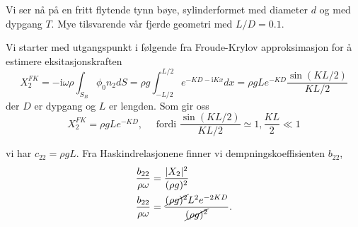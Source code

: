 

Vi ser nå på en fritt flytende tynn bøye, sylinderformet med diameter $d$ og med dypgang $T$. Mye tilsvarende vår fjerde geometri med $L/D = 0.1$.


Vi starter med utgangspunkt i følgende fra Froude-Krylov approksimasjon for å estimere eksitasjonskraften %
\begin{equation}
	X_2^{FK} = - \mathrm{i} \omega \rho \int_{S_B} \phi_0 n_2 dS =\rho g \int_{-L/2}^{L/2} e^{-KD- \mathrm{i}Kx} dx = \rho g L e^{-KD} \frac{\sin(KL/2)}{KL/2} 
\end{equation}
der $D$ er dypgang og $L$ er lengden. 
Som gir oss
\begin{equation} X_2^{FK} 
 = \rho g L e^{-KD} , \quad \text{ fordi } \frac{\sin(KL/2)}{KL/2} \simeq 1,  \frac{KL}{2} \ll 1
\end{equation}

vi har 
$c_{22} = \rho g L$.
Fra Haskindrelasjonene finner vi dempningskoeffisienten $b_{22}$,
\begin{align}
	 \frac{b_{22}}{\rho \omega} &= \frac{|X_2|^2 }{(\rho g)^2}\\
	 \frac{b_{22}}{\rho \omega} &= \frac{\cancel{(\rho g)^2} L^2 e^{-2KD}}{\cancel{(\rho g)^2}}.
\end{align}

